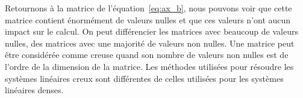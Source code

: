 Retournons à la matrice de l'équation~\eqref{eq:ax_b}, nous pouvons voir que cette matrice contient énormément de valeurs nulles et que ces valeurs n'ont aucun impact sur le calcul.
%
On peut différencier les matrices avec beaucoup de valeurs nulles, des matrices avec une majorité de valeurs non nulles.
%
Une matrice peut être considérée comme creuse quand son nombre de valeurs non nulles est de l'ordre de la dimension de la matrice.
%
Les méthodes utilisées pour résoudre les systèmes linéaires creux sont différentes de celles utilisées pour les systèmes linéaires denses.
